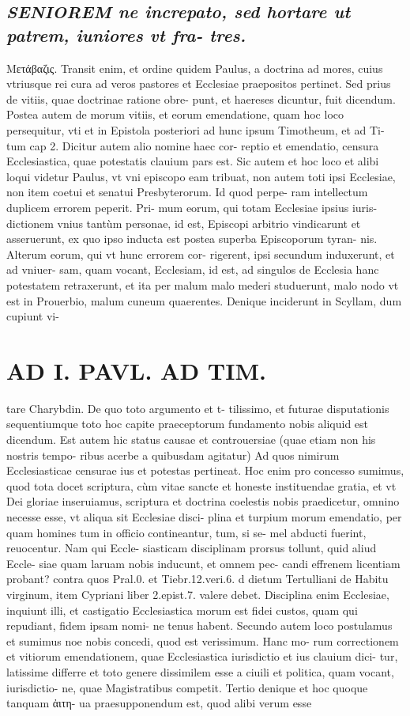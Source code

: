 \documentclass{article}
\begin{document}
\begin{pages}
\subsection*{\textit{\huge\textbf{S}\normalsize ENIOREM ne increpato, sed hortare ut patrem, iuniores vt fra- tres. }}\pstart Μετάβαζις. Transit enim, et ordine quidem Paulus, a doctrina ad mores, cuius vtriusque rei cura ad veros pastores et Ecclesiae praepositos pertinet. Sed prius de vitiis, quae doctrinae ratione obre- punt, et haereses dicuntur, fuit dicendum. Postea autem de morum vitiis, et eorum emendatione, quam hoc loco persequitur, vti et in Epistola posteriori ad hunc ipsum Timotheum, et ad Ti- tum cap 2. Dicitur autem alio nomine haec cor- reptio et emendatio, censura Ecclesiastica, quae potestatis clauium pars est. Sic autem et hoc loco et alibi loqui videtur Paulus, vt vni episcopo eam tribuat, non autem toti ipsi Ecclesiae, non item coetui et senatui Presbyterorum. Id quod perpe- ram intellectum duplicem errorem peperit. Pri- mum eorum, qui totam Ecclesiae ipsius iuris- dictionem vnius tantùm personae, id est, Episcopi arbitrio vindicarunt et asseruerunt, ex quo ipso inducta est postea superba Episcoporum tyran- nis. Alterum eorum, qui vt hunc errorem cor- rigerent, ipsi secundum induxerunt, et ad vniuer- sam, quam vocant, Ecclesiam, id est, ad singulos de Ecclesia hanc potestatem retraxerunt, et ita per malum malo mederi studuerunt, malo nodo vt est in Prouerbio, malum cuneum quaerentes. Denique inciderunt in Scyllam, dum cupiunt vi-  \pend
\section*{AD I. PAVL. AD TIM. }
\marginpar{[ p.240 ]}\pstart tare Charybdin. De quo toto argumento et t- tilissimo, et futurae disputationis sequentiumque toto hoc capite praeceptorum fundamento nobis aliquid est dicendum. Est autem hic status causae et controuersiae (quae etiam non his nostris tempo- ribus acerbe a quibusdam agitatur) Ad quos nimirum Ecclesiasticae censurae ius et potestas pertineat. Hoc enim pro concesso sumimus, quod tota docet scriptura, cùm vitae sancte et honeste instituendae gratia, et vt Dei gloriae inseruiamus, scriptura et doctrina coelestis nobis praedicetur, omnino necesse esse, vt aliqua sit Ecclesiae disci- plina et turpium morum emendatio, per quam homines tum in officio contineantur, tum, si se- mel abducti fuerint, reuocentur. Nam qui Eccle- siasticam disciplinam prorsus tollunt, quid aliud Eccle- siae quam laruam nobis inducunt, et omnem pec- candi effrenem licentiam probant? contra quos Pral.0. et Tiebr.12.veri.6. d dietum Tertulliani de Habitu virginum, item Cypriani liber  2.epist.7. valere debet. Disciplina enim Ecclesiae, inquiunt illi, et castigatio Ecclesiastica morum est fidei custos, quam qui repudiant, fidem ipsam nomi- ne tenus habent. Secundo autem loco postulamus et sumimus  \pend\pstart noe nobis concedi, quod est verissimum. Hanc mo- rum correctionem et vitiorum emendationem, quae Ecclesiastica iurisdictio et ius clauium dici- tur, latissime differre et toto genere dissimilem esse a ciuili et politica, quam vocant, iurisdictio- ne, quae Magistratibus competit.  \pend\pstart Tertio denique et hoc quoque tanquam ἀιτη- ua praesupponendum est, quod alibi verum esse  \pend

\end{pages}
\end{document}
